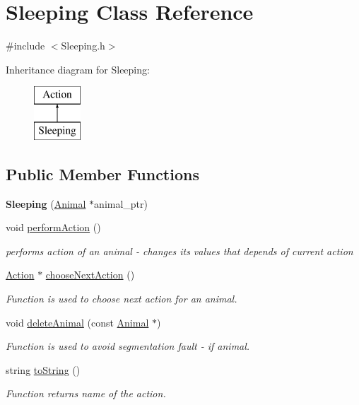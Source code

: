 \hypertarget{class_sleeping}{}\section{Sleeping Class Reference}
\label{class_sleeping}


{\ttfamily \#include $<$Sleeping.\+h$>$}

Inheritance diagram for Sleeping\+:\begin{figure}[H]
\begin{center}
\leavevmode
\includegraphics[height=2.000000cm]{class_sleeping}
\end{center}
\end{figure}
\subsection*{Public Member Functions}
\begin{DoxyCompactItemize}
\item 
\hypertarget{class_sleeping_a647c313fc4ba4ffd5c9fc28713fae267}{}{\bfseries Sleeping} (\hyperlink{class_animal}{Animal} $\ast$animal\+\_\+ptr)\label{class_sleeping_a647c313fc4ba4ffd5c9fc28713fae267}

\item 
void \hyperlink{class_sleeping_a075291ac36c4c702728c1c6029a30ed7}{perform\+Action} ()
\begin{DoxyCompactList}\small\item\em performs action of an animal -\/ changes it\textquotesingle{}s values that depends of current action \end{DoxyCompactList}\item 
\hyperlink{class_action}{Action} $\ast$ \hyperlink{class_sleeping_ab7e0642b9b9a7acdf61c5dcd0bc41e59}{choose\+Next\+Action} ()
\begin{DoxyCompactList}\small\item\em Function is used to choose next action for an animal. \end{DoxyCompactList}\item 
void \hyperlink{class_sleeping_ab89f2382c544e14fad56c4476e7aad0e}{delete\+Animal} (const \hyperlink{class_animal}{Animal} $\ast$)
\begin{DoxyCompactList}\small\item\em Function is used to avoid segmentation fault -\/ if animal. \end{DoxyCompactList}\item 
string \hyperlink{class_sleeping_a7a9f89f9febd753e6eb99618cb714440}{to\+String} ()
\begin{DoxyCompactList}\small\item\em Function returns name of the action. \end{DoxyCompactList}\end{DoxyCompactItemize}
